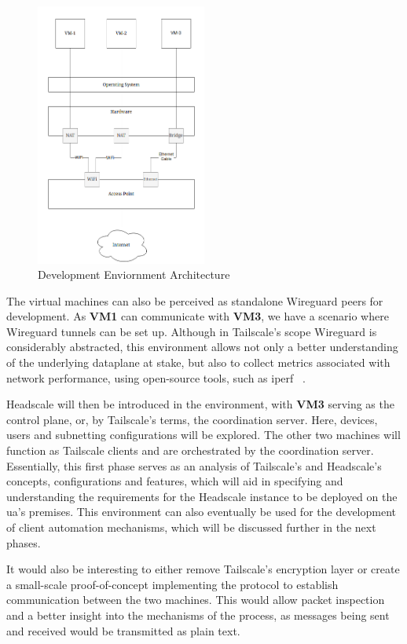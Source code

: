 \documentclass[11pt,twoside,a4paper]{report}
\begin{document}
\begin{figure}[h]
\centering
\includegraphics[width=0.5\textwidth]{dev.png}
\caption{Development Enviornment Architecture}
\label{fig:sandbox}
\end{figure}

The virtual machines can also be perceived as standalone Wireguard peers for development. As \textbf{VM1} can communicate with \textbf{VM3}, we have a scenario where Wireguard tunnels can be set up. Although in Tailscale's scope Wireguard is considerably abstracted, this environment allows not only a better understanding of the underlying dataplane at stake, but also to collect metrics associated with network performance, using open-source tools, such as iperf ~\cite{iperfws}.

Headscale will then be introduced in the environment, with \textbf{VM3} serving as the control plane, or, by Tailscale's terms, the coordination server. Here, devices, users and subnetting configurations will be explored. The other two machines will function as Tailscale clients and are orchestrated by the coordination server. Essentially, this first phase serves as an analysis of Tailscale's and Headscale's concepts, configurations and features, which will aid in specifying and understanding the requirements for the Headscale instance to be deployed on the \ac{ua}'s premises. This environment can also eventually be used for the development of client automation mechanisms, which will be discussed further in the next phases.

It would also be interesting to either remove Tailscale's encryption layer or create a small-scale proof-of-concept implementing the protocol to establish communication between the two machines. This would allow packet inspection and a better insight into the mechanisms of the process, as messages being sent and received would be transmitted as plain text.
\end{document}
